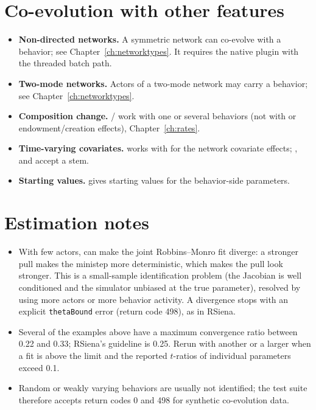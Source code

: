 \section{Co-evolution with other features}

\begin{itemize}[nosep]
\item \textbf{Non-directed networks.} A symmetric network can co-evolve with a behavior; see Chapter~\ref{ch:networktypes}. It requires the native plugin with the threaded batch path.
\item \textbf{Two-mode networks.} Actors of a two-mode network may carry a behavior; see Chapter~\ref{ch:networktypes}.
\item \textbf{Composition change.} / work with one or several behaviors (not with  or endowment/creation effects), Chapter~\ref{ch:rates}.
\item \textbf{Time-varying covariates.}  works with  for the network covariate effects; ,  and  accept a  stem.
\item \textbf{Starting values.}  gives starting values for the behavior-side parameters.
\end{itemize}

\section{Estimation notes}

\begin{itemize}[nosep]
\item With few actors,  can make the joint Robbins--Monro fit diverge: a stronger pull makes the ministep more deterministic, which makes the pull look stronger. This is a small-sample identification problem (the Jacobian is well conditioned and the simulator unbiased at the true parameter), resolved by using more actors or more behavior activity. A divergence stops with an explicit \texttt{thetaBound} error (return code 498), as in RSiena.
\item Several of the examples above have a maximum convergence ratio between 0.22 and 0.33; RSiena's guideline is 0.25. Rerun with another  or a larger  when a fit is above the limit and the reported $t$-ratios of individual parameters exceed 0.1.
\item Random or weakly varying behaviors are usually not identified; the test suite therefore accepts return codes 0 and 498 for synthetic co-evolution data.
\end{itemize}

